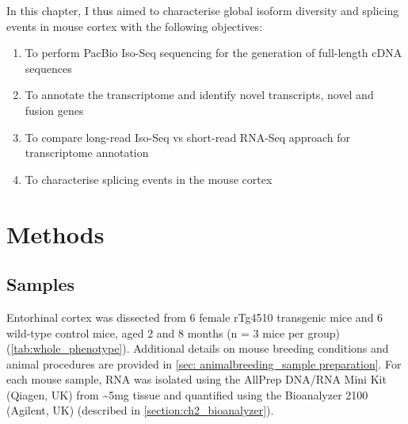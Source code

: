 \newpage
In this chapter, I thus aimed to characterise global isoform diversity and splicing events in mouse cortex with the following objectives:
\begin{enumerate}
	\item To perform PacBio Iso-Seq sequencing for the generation of full-length cDNA sequences 
	\item To annotate the transcriptome and identify novel transcripts, novel and fusion genes  
	\item To compare long-read Iso-Seq vs short-read RNA-Seq approach for transcriptome annotation 
	\item To characterise splicing events in the mouse cortex  	
\end{enumerate} 

\section{Methods}
\subsection{Samples}
Entorhinal cortex was dissected from 6 female rTg4510 transgenic mice and 6 wild-type control mice, aged 2 and 8 months (n = 3 mice per group) (\cref{tab:whole_phenotype}). Additional details on mouse breeding conditions and animal procedures are provided in \cref{sec: animalbreeding_sample preparation}. For each mouse sample, RNA was isolated using the AllPrep DNA/RNA Mini Kit (Qiagen, UK) from \textasciitilde5mg tissue and quantified using the Bioanalyzer 2100 (Agilent, UK) (described in \cref{section:ch2_bioanalyzer}). 

